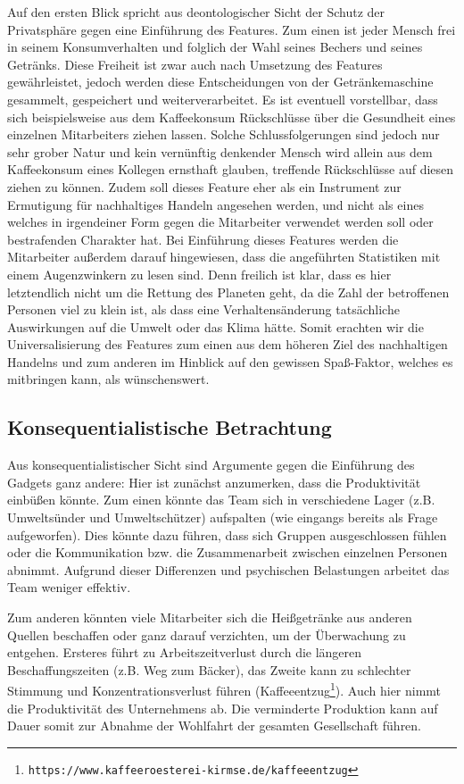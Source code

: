 \documentclass[a4paper,12pt,]{article}
\begin{document}
Auf den ersten Blick spricht aus deontologischer Sicht der Schutz der Privatsphäre gegen eine Einführung des Features. Zum einen ist jeder Mensch frei in seinem Konsumverhalten und folglich der Wahl seines Bechers und seines Getränks. Diese Freiheit ist zwar auch nach Umsetzung des Features gewährleistet, jedoch werden diese Entscheidungen von der Getränkemaschine gesammelt, gespeichert und weiterverarbeitet.
Es ist eventuell vorstellbar, dass sich beispielsweise aus dem Kaffeekonsum Rückschlüsse über die Gesundheit eines einzelnen Mitarbeiters ziehen lassen. Solche Schlussfolgerungen sind jedoch nur sehr grober Natur und kein vernünftig denkender Mensch wird allein aus dem Kaffeekonsum eines Kollegen ernsthaft glauben, treffende Rückschlüsse auf diesen ziehen zu können. Zudem soll dieses Feature eher als ein Instrument zur Ermutigung für nachhaltiges Handeln angesehen werden, und nicht als eines welches in irgendeiner Form gegen die Mitarbeiter verwendet werden soll oder bestrafenden Charakter hat.  Bei Einführung dieses Features werden die Mitarbeiter außerdem darauf hingewiesen, dass die angeführten Statistiken mit einem Augenzwinkern zu lesen sind. Denn freilich ist klar, dass es hier letztendlich nicht um die Rettung des Planeten geht, da die Zahl der betroffenen Personen viel zu klein ist, als dass eine Verhaltensänderung tatsächliche Auswirkungen auf die Umwelt oder das Klima hätte.  Somit erachten wir die Universalisierung des Features zum einen aus dem höheren Ziel des nachhaltigen Handelns und zum anderen im Hinblick auf den gewissen Spaß-Faktor, welches es mitbringen kann,  als wünschenswert.


\subsection{Konsequentialistische Betrachtung}

Aus konsequentialistischer Sicht sind Argumente gegen die Einführung des Gadgets ganz andere: Hier ist zunächst anzumerken, dass die Produktivität einbüßen könnte. Zum einen könnte das Team sich in verschiedene Lager (z.B. Umweltsünder und Umweltschützer) aufspalten (wie eingangs bereits als Frage aufgeworfen). Dies könnte dazu führen, dass sich Gruppen ausgeschlossen fühlen oder die Kommunikation bzw. die Zusammenarbeit zwischen einzelnen Personen abnimmt. Aufgrund dieser Differenzen und psychischen Belastungen arbeitet das Team weniger effektiv.

Zum anderen könnten viele Mitarbeiter sich die Heißgetränke aus anderen Quellen beschaffen oder ganz darauf verzichten, um der Überwachung zu entgehen. Ersteres führt zu Arbeitszeitverlust durch die längeren Beschaffungszeiten (z.B. Weg zum Bäcker), das Zweite kann zu schlechter Stimmung und Konzentrationsverlust führen (Kaffeeentzug\footnote{\tt https://www.kaffeeroesterei-kirmse.de/kaffeeentzug}). Auch hier nimmt die Produktivität des Unternehmens ab. Die verminderte Produktion kann auf Dauer somit zur Abnahme der Wohlfahrt der gesamten Gesellschaft führen.
\end{document}
